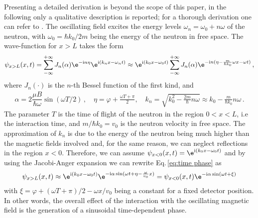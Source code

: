 \documentclass[12pt]{iopart}
\newcommand{\eq}{Eq.}
\newcommand{\I}{\mathrm{i}}
\begin{document}
Presenting a detailed derivation is beyond the scope of this paper, in the following only a qualitative description is reported; for a thorough derivation one can refer to \cite{summhammer1995,summhammer1993, sulyok2011, Haavig1982}. The oscillating field excites the energy levels $\omega_n=\omega_0+n\omega$ of the neutron, with $\omega_0 = \hbar k_0/2m$
being the energy of the neutron in free space. The wave-function for $x>L$ takes the form
\begin{align}
\begin{aligned}
    \psi_{x>L}(x,t) = \sum_{-\infty}^{+\infty}J_n(\alpha)\e^{-\I n \eta} \e^{\I( k_nx-\omega_n t)} \approx \e^{\I( k_0 x-\omega_0 t)} \sum_{-\infty}^{+\infty} J_n(\alpha)\e^{-\I n(\eta-\frac{m}{\hbar k_0}\omega x - \omega t )} \,,
\end{aligned} \label{eq:time phase}
\end{align}
where $J_n(\cdot)$ is the $n$-th Bessel function of the first kind, and
\begin{align}
    \alpha = 2\dfrac{\mu B}{\hbar \omega} \sin(\omega T/2)\,,\quad \eta = \varphi + \frac{\omega T+\pi}{2}, \quad k_n = \sqrt{k_0^2-\frac{2m}{\hbar}n\omega} \approx k_0 -\frac{m}{\hbar k_0}n\omega\,.
\end{align}
The parameter $T$ is the time of flight of the neutron in the region $0<x<L$, i.e the interaction time, and $m/\hbar k_0=v_0$ is the neutron velocity in free space. The approximation of $k_n$ is due to the energy of the neutron being much higher than the magnetic fields involved and, for the same reason, we can neglect reflections in the region $x<0$. Therefore, we can assume $\psi_{x<0}(x,t)=\e^{\I( k_0 x-\omega_0 t)}$ and by using the Jacobi-Anger expansion we can rewrite \eq\,\eqref{eq:time phase} as
\begin{align}
\begin{aligned}
    \psi_{x>L}(x,t) \approx \e^{\I( k_0 x-\omega_0 t)} \e^{-\I \alpha \sin(\omega t+\eta-\frac{\omega}{v_0} x)} = \psi_{x<0}(x,t) \e^{-\I \alpha \sin(\omega t+\xi)}
\end{aligned}
\end{align}
with $\xi=\varphi+(\omega T+\pi)/2-\omega x/v_0$ being a constant for a fixed detector position. In other words, the overall effect of the interaction with the oscillating magnetic field is the generation of a sinusoidal time-dependent phase.
\end{document}
